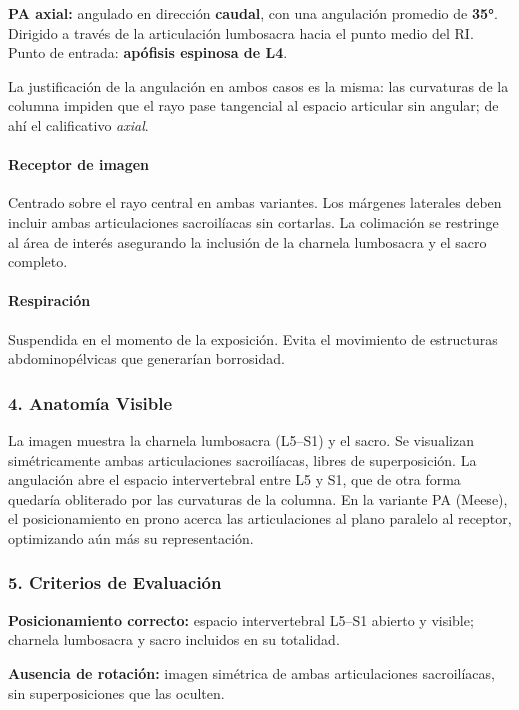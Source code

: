 		\textbf{PA axial:} angulado en dirección \textbf{caudal}, con una angulación promedio de \textbf{35°}. Dirigido a través de la articulación lumbosacra hacia el punto medio del RI. Punto de entrada: \textbf{apófisis espinosa de L4}.
		
		La justificación de la angulación en ambos casos es la misma: las curvaturas de la columna impiden que el rayo pase tangencial al espacio articular sin angular; de ahí el calificativo \textit{axial}.
		
		\paragraph{Receptor de imagen}
		Centrado sobre el rayo central en ambas variantes. Los márgenes laterales deben incluir ambas articulaciones sacroilíacas sin cortarlas. La colimación se restringe al área de interés asegurando la inclusión de la charnela lumbosacra y el sacro completo.
		
		\paragraph{Respiración}
		Suspendida en el momento de la exposición. Evita el movimiento de estructuras abdominopélvicas que generarían borrosidad.
		
		\subsubsection*{4. Anatomía Visible}
		
		La imagen muestra la charnela lumbosacra (L5--S1) y el sacro. Se visualizan simétricamente ambas articulaciones sacroilíacas, libres de superposición. La angulación abre el espacio intervertebral entre L5 y S1, que de otra forma quedaría obliterado por las curvaturas de la columna. En la variante PA (Meese), el posicionamiento en prono acerca las articulaciones al plano paralelo al receptor, optimizando aún más su representación.
		
		\subsubsection*{5. Criterios de Evaluación}
		
		\textbf{Posicionamiento correcto:} espacio intervertebral L5--S1 abierto y visible; charnela lumbosacra y sacro incluidos en su totalidad.
		
		\textbf{Ausencia de rotación:} imagen simétrica de ambas articulaciones sacroilíacas, sin superposiciones que las oculten.
		
